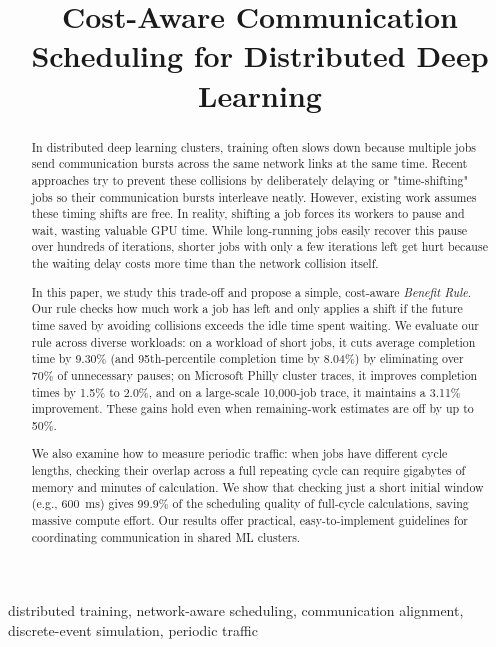 \documentclass[conference]{IEEEtran}
\begin{document}
\title{Cost-Aware Communication Scheduling for Distributed Deep Learning}

\author{
\and
{}
}

\maketitle

\begin{abstract}
In distributed deep learning clusters, training often slows down because
multiple jobs send communication bursts across the same network links at
the same time. Recent approaches try to prevent these collisions by
deliberately delaying or "time-shifting" jobs so their communication
bursts interleave neatly. However, existing work assumes these timing shifts
are free. In reality, shifting a job forces its workers to pause and wait,
wasting valuable GPU time. While long-running jobs easily recover this pause
over hundreds of iterations, shorter jobs with only a few iterations left
get hurt because the waiting delay costs more time than the network collision itself.

In this paper, we study this trade-off and propose a simple, cost-aware
\emph{Benefit Rule}. Our rule checks how much work a job has left and only
applies a shift if the future time saved by avoiding collisions exceeds
the idle time spent waiting. We evaluate our rule across diverse workloads:
on a workload of short jobs, it cuts average completion time by 9.30\% (and
95th-percentile completion time by 8.04\%) by eliminating over 70\% of
unnecessary pauses; on Microsoft Philly cluster traces, it improves completion
times by 1.5\% to 2.0\%, and on a large-scale 10,000-job trace, it maintains
a 3.11\% improvement. These gains hold even when remaining-work estimates
are off by up to 50\%.

We also examine how to measure periodic traffic: when jobs have different cycle
lengths, checking their overlap across a full repeating cycle can require
gigabytes of memory and minutes of calculation. We show that checking just
a short initial window (e.g., 600~ms) gives 99.9\% of the scheduling quality
of full-cycle calculations, saving massive compute effort. Our results offer
practical, easy-to-implement guidelines for coordinating communication in
shared ML clusters.
\end{abstract}

\begin{IEEEkeywords}
distributed training, network-aware scheduling, communication alignment,
discrete-event simulation, periodic traffic
\end{IEEEkeywords}
\end{document}
